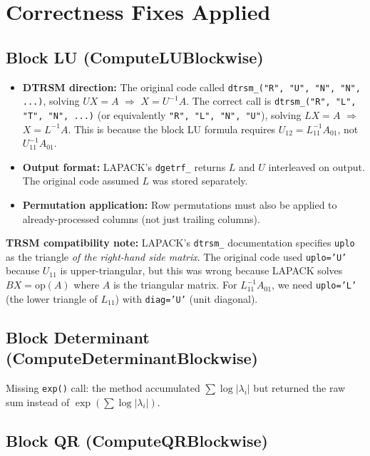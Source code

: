 \documentclass[11pt,a4paper]{article}
\begin{document}
\section{Correctness Fixes Applied}

\subsection{Block LU (ComputeLUBlockwise)}

\begin{itemize}
\item \textbf{DTRSM direction:} The original code called
  \texttt{dtrsm\_("R", "U", "N", "N", ...)}, solving $U X = A$ $\Rightarrow$
  $X = U^{-1} A$.  The correct call is \texttt{dtrsm\_("R", "L", "T", "N",
  ...)} (or equivalently \texttt{"R", "L", "N", "U"}), solving $L X = A$
  $\Rightarrow$ $X = L^{-1} A$.  This is because the block LU formula requires
  $U_{12} = L_{11}^{-1} A_{01}$, not $U_{11}^{-1} A_{01}$.
\item \textbf{Output format:} LAPACK's \texttt{dgetrf\_} returns $L$ and $U$
  interleaved on output. The original code assumed $L$ was stored separately.
\item \textbf{Permutation application:} Row permutations must also be applied
  to already-processed columns (not just trailing columns).
\end{itemize}

\textbf{TRSM compatibility note:} LAPACK's \texttt{dtrsm\_} documentation
specifies \texttt{uplo} as the triangle \emph{of the right-hand side matrix}.
The original code used \texttt{uplo='U'} because $U_{11}$ is upper-triangular,
but this was wrong because LAPACK solves $B X = \text{op}(A)$ where $A$ is the
triangular matrix. For $L_{11}^{-1} A_{01}$, we need \texttt{uplo='L'} (the
lower triangle of $L_{11}$) with \texttt{diag='U'} (unit diagonal).

\subsection{Block Determinant (ComputeDeterminantBlockwise)}

Missing \texttt{exp()} call: the method accumulated $\sum \log|\lambda_i|$ but
returned the raw sum instead of $\exp(\sum \log|\lambda_i|)$.

\subsection{Block QR (ComputeQRBlockwise)}
\end{document}
